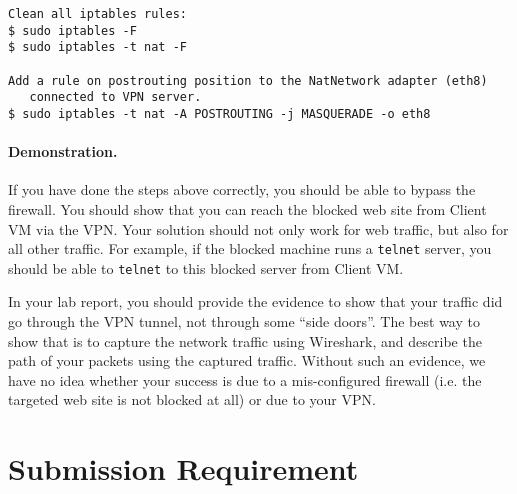     
\begin{lstlisting}
Clean all iptables rules:
$ sudo iptables -F
$ sudo iptables -t nat -F 

Add a rule on postrouting position to the NatNetwork adapter (eth8)
   connected to VPN server.
$ sudo iptables -t nat -A POSTROUTING -j MASQUERADE -o eth8
\end{lstlisting}
    


\paragraph{Demonstration.}
If you have done the steps above correctly, you should be able to bypass
the firewall. You should show that you can reach the blocked web site from Client VM
via the VPN.  Your solution should
not only work for web traffic, but also for all other traffic. For example, if the blocked
machine runs a \texttt{telnet} server, you should be able to \texttt{telnet} to this blocked server from
Client VM. 

In your lab report, you should provide the evidence to show that your traffic did go through
the VPN tunnel, not through some ``side doors''. The best way to show that is to capture the
network traffic using Wireshark, and describe the path of your packets using the captured
traffic. Without such an evidence, we have no idea whether your success is due to a
mis-configured firewall (i.e. the targeted web site is not blocked at all) or due to your VPN.



\section{Submission Requirement}


\seedsubmission





